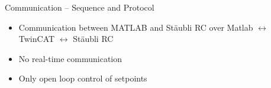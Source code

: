\documentclass[
xcolor=dvipsnames,
aspectratio=169,
9pt,
]{beamer}
\begin{document}
\begin{frame}{Communication -- Sequence and Protocol}
%
%


\begin{itemize}
	\item Communication between MATLAB and Stäubli RC over Matlab \(\leftrightarrow\) TwinCAT \(\leftrightarrow\) Stäubli RC 
	\item No real-time  communication
	\item Only open loop control of setpoints
\end{itemize}

\end{frame}
\end{document}
